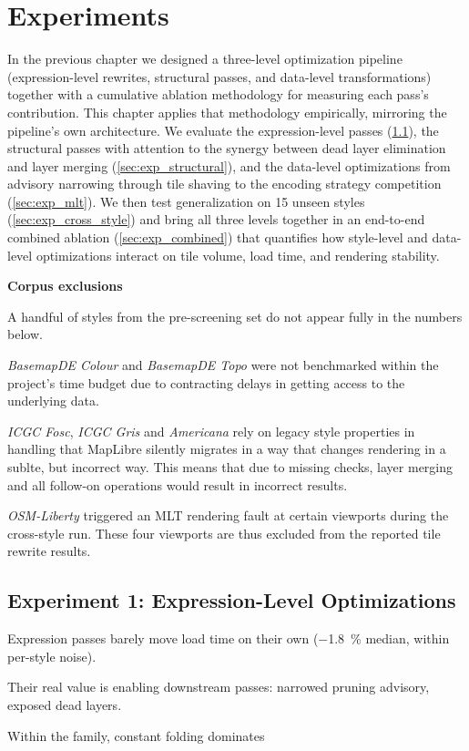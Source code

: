 \chapter{Experiments}\label{ch:experiments}

In the previous chapter we designed a three-level optimization pipeline (expression-level rewrites, structural passes, and data-level transformations) together with a cumulative ablation methodology for measuring each pass's contribution.
This chapter applies that methodology empirically, mirroring the pipeline's own architecture.
We evaluate the expression-level passes (\cref{sec:exp_expressions}), the structural passes with attention to the synergy between dead layer elimination and layer merging (\cref{sec:exp_structural}), and the data-level optimizations from advisory narrowing through tile shaving to the encoding strategy competition (\cref{sec:exp_mlt}).
We then test generalization on 15 unseen styles (\cref{sec:exp_cross_style}) and bring all three levels together in an end-to-end combined ablation (\cref{sec:exp_combined}) that quantifies how style-level and data-level optimizations interact on tile volume, load time, and rendering stability.

\begin{tcolorbox}[
  enhanced,
  blanker,
  borderline west={2mm}{0pt}{TUMOrange!50},
  left=5mm,
  right=0mm,
  top=1mm,
  bottom=1mm,
  before skip=12pt,
  after skip=14pt
]
\textbf{Corpus exclusions}\par\vspace{2pt}
A handful of styles from the pre-screening set do not appear fully in the numbers below.

\emph{BasemapDE Colour} and \emph{BasemapDE Topo} were not benchmarked within the project's time budget due to contracting delays in getting access to the underlying data.

\emph{ICGC Fosc}, \emph{ICGC Gris} and \emph{Americana} rely on legacy style properties in  handling that MapLibre silently migrates in a way that changes rendering in a sublte, but incorrect way.
This means that due to missing checks, layer merging and all follow-on operations would result in incorrect results.

\emph{OSM-Liberty} triggered an \ac{MLT} rendering fault at certain viewports during the cross-style run.
These four viewports are thus excluded from the reported tile rewrite results.
\end{tcolorbox}

\section{Experiment 1: Expression-Level Optimizations}\label{sec:exp_expressions}
\begin{keytakeaways}
\item Expression passes barely move load time on their own (\qty{-1.8}{\percent} median, within per-style noise).
\item Their real value is enabling downstream passes: narrowed pruning advisory, exposed dead layers.
\item Within the family, constant folding dominates
\end{keytakeaways}

